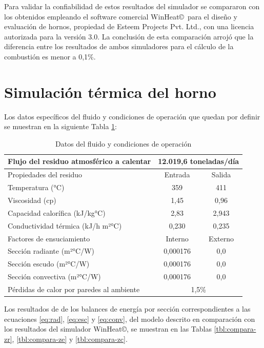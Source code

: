 \par Para validar la confiabilidad de estos resultados del simulador se compararon con los obtenidos empleando el software comercial WinHeat\copyright\ para el diseño y evaluación de hornos, propiedad de Esteem Projects Pvt. Ltd., con una licencia autorizada para la versión 3.0. La conclusión de esta comparación arrojó que la diferencia entre los resultados de ambos simuladores para el cálculo de la combustión es menor a 0,1\%. 
\section{Simulación térmica del horno}
\par Los datos específicos del fluido y condiciones de operación que quedan por definir se muestran en la siguiente Tabla \ref{tbl:props}:
\begin{table}[htb]\begin{center}
\caption[Datos del fluido y condiciones de operación]{Datos del fluido y condiciones de operación}
\label{tbl:props}\begin{tabular}{l|c|c}
	Flujo del residuo atmosférico a calentar  & \multicolumn{2}{c}{12.019,6 toneladas/día} \\
	\hline
    Propiedades del residuo  & Entrada   & Salida \\
    Temperatura          (°C)       & 359    & 411 \\
	Viscosidad	         (cp)	    & 1,45	& 0,96 \\
	Capacidad calorífica (kJ/kg°C)	& 2,83 	& 2,943	 \\
	Conductividad térmica (kJ/h m²°C) & 0,230& 0,235	 \\
	\hline
	Factores de ensuciamiento & Interno & Externo\\
	Sección radiante	(m²°C/W)  & 0,000176	& 0,0 \\
	Sección escudo		(m²°C/W)  & 0,000176	& 0,0 \\
	Sección convectiva	(m²°C/W)  & 0,000176	& 0,0 \\
    \hline
	Pérdidas de calor por paredes al ambiente & \multicolumn{2}{c}{1,5\%} \\
\end{tabular}\end{center}\end{table}
\par Los resultados de de los balances de energía por sección correspondientes a las ecuaciones \ref{eq:rad}, \ref{eq:esc} y \ref{eq:conv}, del modelo descrito en comparación con los resultados del simulador WinHeat\copyright, se muestran en las Tablas \ref{tbl:compara-zr}, \ref{tbl:compara-ze} y \ref{tbl:compara-zc}.
